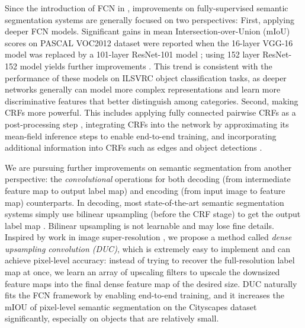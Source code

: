 \documentclass[10pt,twocolumn,letterpaper]{article}
\begin{document}
Since the introduction of FCN in \cite{long2015fully}, improvements on fully-supervised semantic segmentation systems are generally focused on two perspectives: First, applying deeper FCN models. Significant gains in mean Intersection-over-Union (mIoU) scores on PASCAL VOC2012 dataset \cite{pascal-voc-2012} were reported when the 16-layer VGG-16 model \cite{simonyan2014very} was replaced by a 101-layer ResNet-101 \cite{he2015deep} model \cite{chen2016deeplab}; using 152 layer ResNet-152 model yields further improvements \cite{wu2016high}. This trend is consistent with the performance of these models on ILSVRC \cite{russakovsky2015imagenet} object classification tasks, as deeper networks generally can model more complex representations and learn more discriminative features that better distinguish among categories. Second, making CRFs more powerful. This includes applying fully connected pairwise CRFs \cite{koltun2011efficient} as a post-processing step \cite{chen2016deeplab}, integrating CRFs into the network by approximating its mean-field inference steps \cite{zheng2015conditional,liu2015semantic,lin2015efficient} to enable end-to-end training, and incorporating additional information into CRFs such as edges \cite{kokkinos2015pushing} and object detections \cite{arnab2015higher}.

We are pursuing further improvements on semantic segmentation from another perspective: the \textit{convolutional} operations for both decoding (from intermediate feature map to output label map) and encoding (from input image to feature map) counterparts. In decoding, most state-of-the-art semantic segmentation systems simply use bilinear upsampling (before the CRF stage) to get the output label map \cite{lin2015efficient,liu2015semantic,chen2016deeplab}. Bilinear upsampling is not learnable and may lose fine details. Inspired by work in image super-resolution \cite{shi2016real}, we propose a method called  \textit{dense upsampling convolution (DUC)}, which is extremely easy to implement and can achieve pixel-level accuracy: instead of trying to recover the full-resolution label map at once, we learn an array of upscaling filters to upscale the downsized feature maps into the final dense feature map of the desired size. DUC naturally fits the FCN framework by enabling end-to-end training, and it increases the mIOU of pixel-level semantic segmentation on the Cityscapes dataset \cite{Cordts2016Cityscapes} significantly, especially on objects that are relatively small. 
\end{document}
